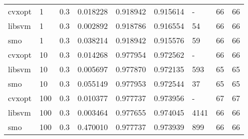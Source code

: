 \begin{tabular}{lllrrrlrr}
cvxopt &   1 &     0.3 &  0.018228 &  0.918942 & 0.915614 &      - &          66 &        66 \\
libsvm &   1 &     0.3 &  0.002892 &  0.918786 & 0.916554 &     54 &          66 &        66 \\
   smo &   1 &     0.3 &  0.038214 &  0.918942 & 0.915576 &     59 &          66 &        66 \\
cvxopt &  10 &     0.3 &  0.014268 &  0.977954 & 0.972562 &      - &          66 &        66 \\
libsvm &  10 &     0.3 &  0.005697 &  0.977870 & 0.972135 &    593 &          65 &        65 \\
   smo &  10 &     0.3 &  0.055149 &  0.977953 & 0.972544 &     37 &          65 &        65 \\
cvxopt & 100 &     0.3 &  0.010377 &  0.977737 & 0.973956 &      - &          67 &        67 \\
libsvm & 100 &     0.3 &  0.003464 &  0.977655 & 0.974045 &   4141 &          66 &        66 \\
   smo & 100 &     0.3 &  0.470010 &  0.977737 & 0.973939 &    899 &          66 &        66 \\
\bottomrule
\end{tabular}
